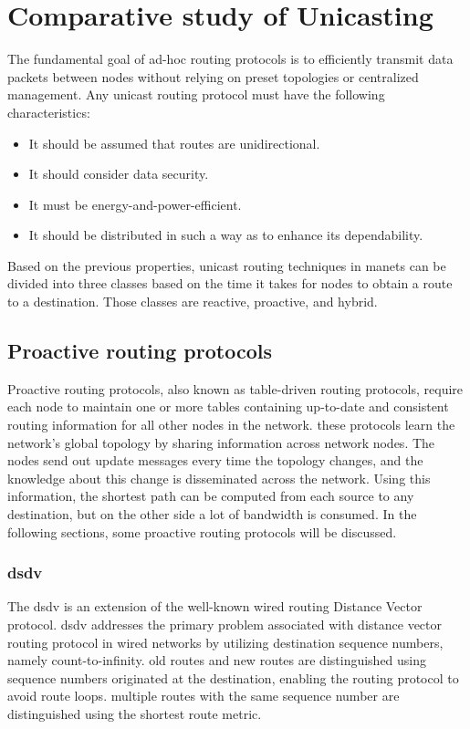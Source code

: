 \section{Comparative study of Unicasting}
The fundamental goal of ad-hoc routing protocols is to efficiently transmit data packets between nodes without relying on preset topologies or centralized management. Any unicast routing protocol must have the following characteristics: 
\begin{itemize}[itemsep=1pt, topsep=5pt]
    \item It should be assumed that routes are unidirectional.
    \item It should consider data security.
    \item It must be energy-and-power-efficient.
    \item It should be distributed in such a way as to enhance its dependability.
\end{itemize}  

Based on the previous properties, unicast routing techniques in \acrshort{manets} can be divided into three classes based on the time it takes for nodes to obtain a route to a destination. Those classes are reactive, proactive, and hybrid.

\subsection{Proactive routing protocols}
Proactive routing protocols, also known as table-driven routing protocols, require each node to maintain one or more tables containing up-to-date and consistent routing information for all other nodes in the network. these protocols learn the network's global topology by sharing information across network nodes. The nodes send out update messages every time the topology changes, and the knowledge about this change is disseminated across the network. Using this information, the shortest path can be computed from each source to any destination, but on the other side a lot of bandwidth is consumed\cite{unicast2}. In the following sections, some proactive routing protocols will be discussed.

\subsubsection{\acrfull{dsdv}}
The \acrfull{dsdv} is an extension of the well-known wired routing Distance Vector protocol. \acrshort{dsdv} addresses the primary problem associated with distance vector routing protocol in wired networks by utilizing destination sequence numbers, namely count-to-infinity. old routes and new routes are distinguished using sequence numbers originated at the destination, enabling the routing protocol to avoid route loops. multiple routes with the same sequence number are distinguished using the shortest route metric.\cite{abd2009performance}


